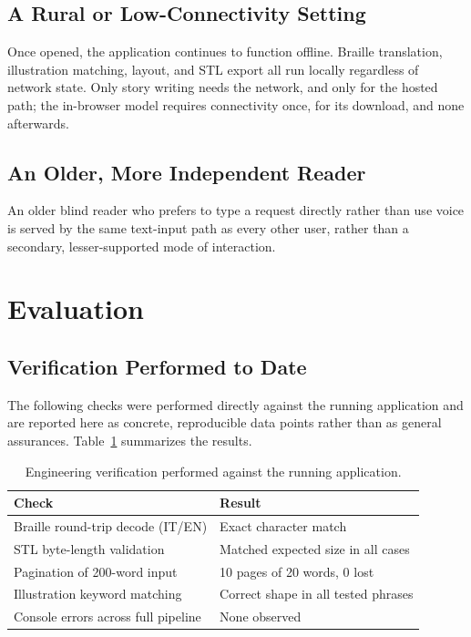 \documentclass[conference]{IEEEtran}
\begin{document}
\subsection{A Rural or Low-Connectivity Setting}

Once opened, the application continues to function offline. Braille translation, illustration matching, layout, and STL export all run locally regardless of network state. Only story writing needs the network, and only for the hosted path; the in-browser model requires connectivity once, for its download, and none afterwards.

\subsection{An Older, More Independent Reader}

An older blind reader who prefers to type a request directly rather than use voice is served by the same text-input path as every other user, rather than a secondary, lesser-supported mode of interaction.

\section{Evaluation}\label{sec:evaluation}

\subsection{Verification Performed to Date}

The following checks were performed directly against the running application and are reported here as concrete, reproducible data points rather than as general assurances. Table~\ref{tab:verification} summarizes the results.

\begin{table}[t]
\caption{Engineering verification performed against the running application.}
\label{tab:verification}
\centering
\begin{tabular}{ll}
\toprule
Check & Result \\
\midrule
Braille round-trip decode (IT/EN) & Exact character match \\
STL byte-length validation & Matched expected size in all cases \\
Pagination of 200-word input & 10 pages of 20 words, 0 lost \\
Illustration keyword matching & Correct shape in all tested phrases \\
Console errors across full pipeline & None observed \\
\bottomrule
\end{tabular}
\end{table}
\end{document}
